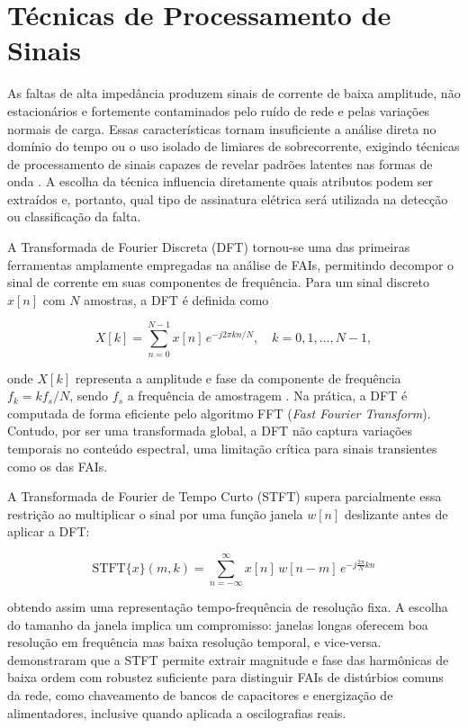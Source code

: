\section{Técnicas de Processamento de Sinais}\label{sec:processamento}

As faltas de alta impedância produzem sinais de corrente de baixa amplitude,
não estacionários e fortemente contaminados pelo ruído de rede e pelas
variações normais de carga. Essas características tornam insuficiente a
análise direta no domínio do tempo ou o uso isolado de limiares de sobrecorrente,
exigindo técnicas de processamento de sinais capazes de revelar padrões
latentes nas formas de onda \cite{Sedighizadeh2010, Aljohani2020}. A escolha da
técnica influencia diretamente quais atributos podem ser extraídos e, portanto,
qual tipo de assinatura elétrica será utilizada na detecção ou
classificação da falta.

A Transformada de Fourier Discreta (DFT) tornou-se uma das primeiras ferramentas amplamente
empregadas na análise de FAIs, permitindo decompor o sinal de corrente em suas
componentes de frequência. Para um sinal discreto $x[n]$ com $N$ amostras, a
DFT é definida como

$$X[k] = \sum_{n=0}^{N-1} x[n]\, e^{-j2\pi kn/N}, \quad k = 0, 1, \ldots, N-1,$$

onde $X[k]$ representa a amplitude e fase da componente de frequência
$f_k = k f_s / N$, sendo $f_s$ a frequência de amostragem \cite{1, Huang1988}.
Na prática, a DFT é computada de forma eficiente pelo algoritmo FFT
(\textit{Fast Fourier Transform}). Contudo, por ser uma transformada global, a
DFT não captura variações temporais no conteúdo espectral, uma
limitação crítica para sinais transientes como os das FAIs.

A Transformada de Fourier de Tempo Curto (STFT) supera parcialmente essa
restrição ao multiplicar o sinal por uma função janela $w[n]$
deslizante antes de aplicar a DFT:

$$
\mathrm{STFT}\{x\}(m,k)
=
\sum_{n=-\infty}^{\infty}
x[n]\,w[n-m]\,
e^{-j\frac{2\pi}{N}kn}
$$

obtendo assim uma representação tempo-frequência de resolução
fixa. A escolha do tamanho da janela implica um compromisso: janelas longas
oferecem boa resolução em frequência mas baixa resolução temporal,
e vice-versa.  demonstraram que a STFT permite extrair magnitude
e fase das harmônicas de baixa ordem com robustez suficiente para distinguir
FAIs de distúrbios comuns da rede, como chaveamento de bancos de capacitores e
energização de alimentadores, inclusive quando aplicada a oscilografias
reais.

